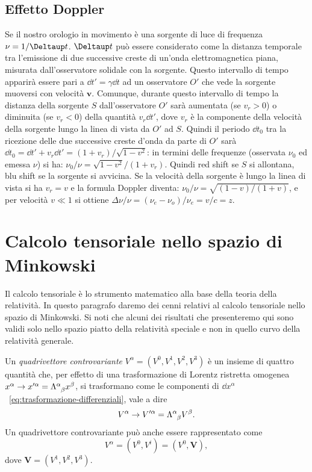 \subsection{Effetto Doppler}
\label{sec:effetto-doppler}
Se il nostro orologio in movimento è una sorgente di luce di frequenza
$\nu=1/\var t$.  $\var t$ può essere considerato come la distanza temporale tra
l'emissione di due successive creste di un'onda elettromagnetica piana, misurata
dall'osservatore solidale con la sorgente.  Questo intervallo di tempo apparirà
essere pari a $\dd t'= \gamma \dd t$ ad un osservatore $O'$ che vede la sorgente
muoversi con velocità $\bm{v}$.  Comunque, durante questo intervallo di tempo la
distanza della sorgente $S$ dall'osservatore $O'$ sarà aumentata (se $v_r>0$) o
diminuita (se $v_r<0$) della quantità $v_r \dd t'$, dove $v_r$ è la componente
della velocità della sorgente lungo la linea di vista da $O'$ ad $S$.  Quindi il
periodo $\dd t_0$ tra la ricezione delle due successive creste d'onda da parte
di $O'$ sarà $\dd t_0 = \dd t'+ v_r \dd t' = (1+v_r)/\sqrt{1-v^2}$: in termini
delle frequenze (osservata $\nu_0$ ed emessa $\nu$) si ha:
$\nu_0/\nu=\sqrt{1-v^2}/(1+v_r)$. Quindi red shift se $S$ si allontana, blu
shift se la sorgente si avvicina.  Se la velocità della sorgente è lungo la
linea di vista si ha $v_r=v$ e la formula Doppler diventa:
$\nu_0/\nu= \sqrt{(1-v)/(1+v)}$, e per velocità $v\ll 1$ si ottiene
$\Delta \nu / \nu = (\nu_e - \nu_o)/\nu_e = v/c = z$.


\section{Calcolo tensoriale nello spazio di Minkowski}
\label{sec:calcolo-tensoriale-minkowski}

Il calcolo tensoriale è lo strumento matematico alla base della teoria della
relatività.  In questo paragrafo daremo dei cenni relativi al calcolo tensoriale
nello spazio di Minkowski.  Si noti che alcuni dei risultati che presenteremo
qui sono validi solo nello spazio piatto della relatività speciale e non in
quello curvo della relatività generale.

Un \emph{quadrivettore controvariante}
$V^{\alpha} = (V^{0}, V^{1}, V^{2}, V^{3})$ è un insieme di quattro quantità
che, per effetto di una trasformazione di Lorentz ristretta omogenea
$x^{\alpha} \to x'^{\alpha} = \tensor{\Lambda}{^{\alpha}_{\beta}}x^{\beta}$, si
trasformano come le componenti di $\dd
x^{\alpha}$~\eqref{eq:trasformazione-differenziali}, vale a dire
\begin{equation}
  V^{\alpha} \to V'^{\alpha} = \tensor{\Lambda}{^{\alpha}_{\beta}}V^{\beta}.
\end{equation}
Un quadrivettore controvariante può anche essere rappresentato come
\begin{equation}
  V^{\alpha} = (V^{0}, V^{i}) = (V^{0}, \bm{V}),
\end{equation}
dove $\bm{V} = (V^{1}, V^{2}, V^{3})$.


